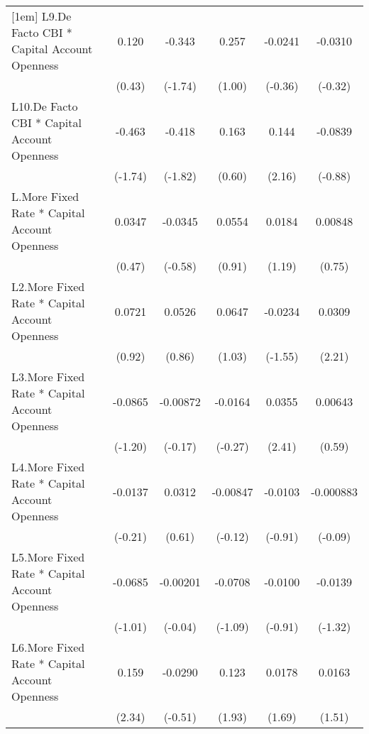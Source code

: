 {\begin{longtable}{l*{5}{c}}
[1em]
L9.De Facto CBI * Capital Account Openness&    0.120         &   -0.343         &    0.257         &  -0.0241         &  -0.0310         \\
                &   (0.43)         &  (-1.74)         &   (1.00)         &  (-0.36)         &  (-0.32)         \\
[1em]
L10.De Facto CBI * Capital Account Openness&   -0.463         &   -0.418         &    0.163         &    0.144\sym{*}  &  -0.0839         \\
                &  (-1.74)         &  (-1.82)         &   (0.60)         &   (2.16)         &  (-0.88)         \\
[1em]
L.More Fixed Rate * Capital Account Openness&   0.0347         &  -0.0345         &   0.0554         &   0.0184         &  0.00848         \\
                &   (0.47)         &  (-0.58)         &   (0.91)         &   (1.19)         &   (0.75)         \\
[1em]
L2.More Fixed Rate * Capital Account Openness&   0.0721         &   0.0526         &   0.0647         &  -0.0234         &   0.0309\sym{*}  \\
                &   (0.92)         &   (0.86)         &   (1.03)         &  (-1.55)         &   (2.21)         \\
[1em]
L3.More Fixed Rate * Capital Account Openness&  -0.0865         & -0.00872         &  -0.0164         &   0.0355\sym{*}  &  0.00643         \\
                &  (-1.20)         &  (-0.17)         &  (-0.27)         &   (2.41)         &   (0.59)         \\
[1em]
L4.More Fixed Rate * Capital Account Openness&  -0.0137         &   0.0312         & -0.00847         &  -0.0103         &-0.000883         \\
                &  (-0.21)         &   (0.61)         &  (-0.12)         &  (-0.91)         &  (-0.09)         \\
[1em]
L5.More Fixed Rate * Capital Account Openness&  -0.0685         & -0.00201         &  -0.0708         &  -0.0100         &  -0.0139         \\
                &  (-1.01)         &  (-0.04)         &  (-1.09)         &  (-0.91)         &  (-1.32)         \\
[1em]
L6.More Fixed Rate * Capital Account Openness&    0.159\sym{*}  &  -0.0290         &    0.123         &   0.0178         &   0.0163         \\
                &   (2.34)         &  (-0.51)         &   (1.93)         &   (1.69)         &   (1.51)         \\

\end{longtable}}
